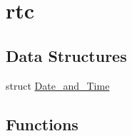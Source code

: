 \hypertarget{group__rtc}{}\section{rtc}
\label{group__rtc}
\subsection*{Data Structures}
\begin{DoxyCompactItemize}
\item 
struct \mbox{\hyperlink{struct_date__and___time}{Date\+\_\+and\+\_\+\+Time}}
\end{DoxyCompactItemize}
\subsection*{Functions}
